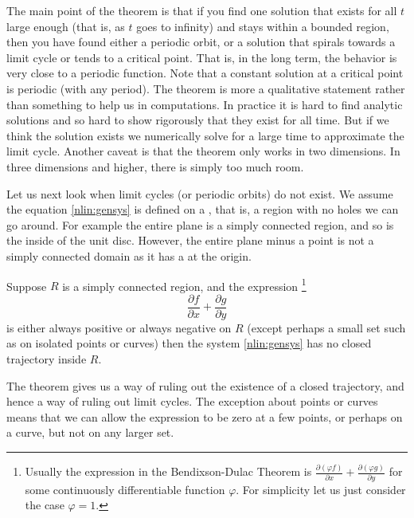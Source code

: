 The main point of the theorem is that if you find one solution that exists
for all $t$ large enough (that is, as $t$ goes to infinity) and stays
within a bounded region, then
you have found either a periodic orbit, or a solution that spirals towards a
limit cycle or tends to a critical point.
That is, in the long term, the
behavior is very close to a periodic function.
Note that a constant solution at a critical point is periodic (with
any period).
The theorem is more a qualitative statement rather than
something to help us in computations.  In practice it is hard to find
analytic solutions and so hard to show rigorously that they exist for all
time.
But if we think the solution exists we numerically solve for a
large time to approximate the limit cycle.
Another caveat is that the theorem only works in two
dimensions.  In three dimensions and higher, there is simply too much room.

Let us next look when limit cycles (or periodic orbits) do not exist.
We assume
the equation \eqref{nlin:gensys} is defined on a
\emph{}, that is, a region with no holes
we can go around.  For example the entire plane is a simply
connected region, and so is the inside of the unit disc.  However,
the entire plane minus a point is not a simply connected domain as it has a
 at the origin.

\begin{theorem}%
Suppose $R$ is a simply connected region,
and the expression%
\footnote{Usually the expression in the Bendixson-Dulac Theorem is
$\frac{\partial (\varphi f)}{\partial x} + \frac{\partial (\varphi
g)}{\partial y}$
for some continuously differentiable function $\varphi$.  For simplicity
let us just consider the case $\varphi = 1$.}
\begin{equation*}
\frac{\partial f}{\partial x} + \frac{\partial g}{\partial y}
\end{equation*}
is either always positive or always negative
on $R$ (except perhaps a small set such as on isolated points or curves)
then the system \eqref{nlin:gensys}
has no closed trajectory inside $R$.
\end{theorem}

The theorem gives us a way of ruling out the existence of a closed
trajectory, and hence a
way of ruling out limit cycles.
The exception about points or curves 
means that we can allow the expression to be zero at a few points,
or perhaps on a curve, but not on any larger set.

